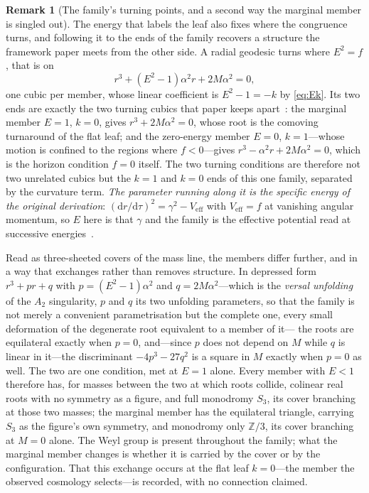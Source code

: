 \documentclass[11pt,a4paper]{article}
\theoremstyle{definition}
\newtheorem{remark}[theorem]{Remark}
\newcommand{\dd}{\mathrm{d}}
\begin{document}
\begin{remark}[The family's turning points, and a second way the marginal member is singled out]\label{rem:turningfamily}
The energy that labels the leaf also fixes where the congruence turns, and following it to the ends of the family recovers a structure the framework paper meets from the other side. A radial geodesic turns where $E^{2}=f$, that is on
\begin{equation}\label{eq:turningfamily}
r^{3}+(E^{2}-1)\alpha^{2}r+2M\alpha^{2}=0 ,
\end{equation}
one cubic per member, whose linear coefficient is $E^{2}-1=-k$ by \eqref{eq:Ek}. Its two ends are exactly the two turning cubics that paper keeps apart~\cite{JanzenCRframework}: the marginal member $E=1$, $k=0$, gives $r^{3}+2M\alpha^{2}=0$, whose root is the comoving turnaround of the flat leaf; and the zero-energy member $E=0$, $k=1$---whose motion is confined to the regions where $f<0$---gives $r^{3}-\alpha^{2}r+2M\alpha^{2}=0$, which is the horizon condition $f=0$ itself. The two turning conditions are therefore not two unrelated cubics but the $k=1$ and $k=0$ ends of this one family, separated by the curvature term. \emph{The parameter running along it is the specific energy of the original derivation}: $(\dd r/\dd\tau)^{2}=\gamma^{2}-V_{\mathrm{eff}}$ with $V_{\mathrm{eff}}=f$ at vanishing angular momentum, so $E$ here is that $\gamma$ and the family is the effective potential read at successive energies~\cite[Eq.~(4.24), Fig.~4.3]{JanzenThesis}.

Read as three-sheeted covers of the mass line, the members differ further, and in a way that exchanges rather than removes structure. In depressed form $r^{3}+pr+q$ with $p=(E^{2}-1)\alpha^{2}$ and $q=2M\alpha^{2}$---which is the \emph{versal unfolding} of the $A_{2}$ singularity, $p$ and $q$ its two unfolding parameters, so that the family is not merely a convenient parametrisation but the complete one, every small deformation of the degenerate root equivalent to a member of it--- the roots are equilateral exactly when $p=0$, and---since $p$ does not depend on $M$ while $q$ is linear in it---the discriminant $-4p^{3}-27q^{2}$ is a square in $M$ exactly when $p=0$ as well. The two are one condition, met at $E=1$ alone. Every member with $E<1$ therefore has, for masses between the two at which roots collide, colinear real roots with no symmetry as a figure, and full monodromy $S_{3}$, its cover branching at those two masses; the marginal member has the equilateral triangle, carrying $S_{3}$ as the figure's own symmetry, and monodromy only $\mathbb{Z}/3$, its cover branching at $M=0$ alone. The Weyl group is present throughout the family; what the marginal member changes is whether it is carried by the cover or by the configuration. That this exchange occurs at the flat leaf $k=0$---the member the observed cosmology selects---is recorded, with no connection claimed.
\end{remark}
\end{document}
